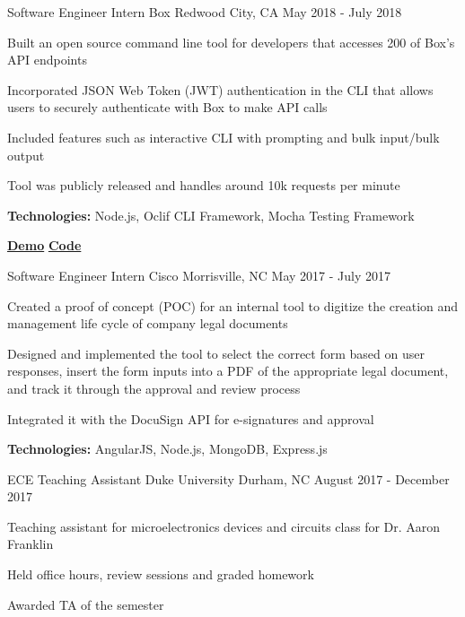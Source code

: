 \begin{cventries}
  \cventry
    {Software Engineer Intern} %
    {Box} %
    {Redwood City, CA} %
    {May 2018 - July 2018} %
    {
      \begin{cvitems} %
        \item{Built an open source command line tool for developers that accesses 200 of Box’s API endpoints}
        \item{Incorporated JSON Web Token (JWT) authentication in the CLI that allows users to securely authenticate with Box to make API calls}
        \item{Included features such as interactive CLI with prompting and bulk input/bulk output}
        \item{Tool was publicly released and handles around 10k requests per minute}
        {\setlength \itemindent{-2ex} \itemsep2pt \item[] \textbf{Technologies:} Node.js, Oclif CLI Framework, Mocha Testing Framework}
        {\setlength \itemindent{-2ex} \itemsep2pt \item[]  \href{https://sujaygarlanka.com/experience.html\#internship}{ \faPlayCircle \textbf{{ Demo}}} \href{https://github.com/box/boxcli}{ \faGithub \textbf{{ Code}}}}
      \end{cvitems}
    }

  \cventry
    {Software Engineer Intern} %
    {Cisco} %
    {Morrisville, NC} %
    {May 2017 - July 2017} %
    {
      \begin{cvitems} %
        \item{Created a proof of concept (POC) for an internal tool to digitize the creation and management life cycle of company legal documents}
        \item{Designed and implemented the tool to select the correct form based on user responses, insert the form inputs into a PDF of the appropriate legal document, and track it through the approval and review process}
        \item{Integrated it with the DocuSign API for e-signatures and approval}
        {\setlength \itemindent{-2ex} \itemsep2pt \item[] \textbf{Technologies:} AngularJS, Node.js, MongoDB, Express.js}
      \end{cvitems}
    }
    
    \cventry
    {ECE Teaching Assistant} %
    {Duke University} %
    {Durham, NC} %
    {August 2017 - December 2017} %
    {
      \begin{cvitems} %
        \item{Teaching assistant for microelectronics devices and circuits class for Dr. Aaron Franklin}
        \item{Held office hours, review sessions and graded homework}
        \item{Awarded TA of the semester}
      \end{cvitems}
    }
\end{cventries}
